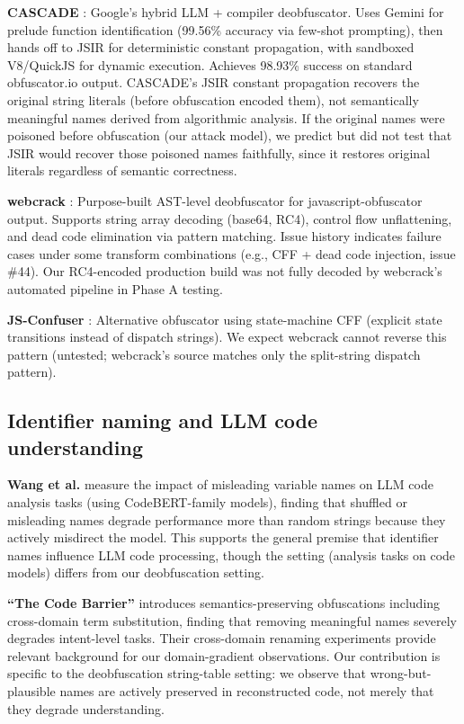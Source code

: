 \documentclass[11pt]{article}
\begin{document}
\textbf{CASCADE} \cite{cascade}: Google's hybrid LLM + compiler deobfuscator. Uses
Gemini for prelude function identification (99.56\% accuracy via
few-shot prompting), then hands off to JSIR for deterministic
constant propagation, with sandboxed V8/QuickJS for dynamic
execution. Achieves 98.93\% success on standard obfuscator.io output.
CASCADE's JSIR constant propagation recovers the original string
literals (before obfuscation encoded them), not semantically
meaningful names derived from algorithmic analysis. If the original
names were poisoned before obfuscation (our attack model), we predict
but did not test that JSIR would recover those poisoned names
faithfully, since it restores original literals regardless of semantic
correctness.

\textbf{webcrack} \cite{webcrack}: Purpose-built AST-level deobfuscator for javascript-obfuscator output. Supports string array decoding (base64, RC4),
control flow unflattening, and dead code elimination via pattern
matching. Issue history indicates failure cases under some transform
combinations (e.g., CFF + dead code injection, issue \#44). Our
RC4-encoded production build was not fully decoded by webcrack's
automated pipeline in Phase A testing.

\textbf{JS-Confuser} \cite{jsconfuser}: Alternative obfuscator using state-machine CFF
(explicit state transitions instead of dispatch strings). We expect
webcrack cannot reverse this pattern (untested; webcrack's source
matches only the split-string dispatch pattern).

\subsection{Identifier naming and LLM code understanding}

\textbf{Wang et al.} \cite{wang2024} measure the impact of misleading variable names
on LLM code analysis tasks (using CodeBERT-family models), finding
that shuffled or misleading names degrade performance more than
random strings because they actively misdirect the model. This
supports the general premise that identifier names influence LLM
code processing, though the setting (analysis tasks on code models)
differs from our deobfuscation setting.

\textbf{``The Code Barrier''} \cite{codebarrier} introduces semantics-preserving
obfuscations including cross-domain term substitution, finding that
removing meaningful names severely degrades intent-level tasks.
Their cross-domain renaming experiments provide relevant background
for our domain-gradient observations. Our contribution is specific
to the deobfuscation string-table setting: we observe that
wrong-but-plausible names are actively preserved in reconstructed
code, not merely that they degrade understanding.
\end{document}
